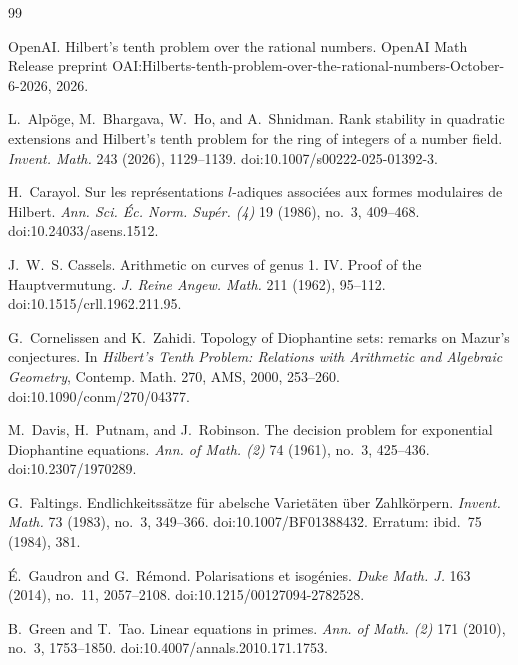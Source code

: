 \documentclass[11pt]{article}
\theoremstyle{definition}
\begin{document}
\begin{thebibliography}{99}\small

OpenAI.
\newblock Hilbert's tenth problem over the rational numbers.
\newblock OpenAI Math Release preprint
  OAI:Hilberts-tenth-problem-over-the-rational-numbers-October-6-2026, 2026.

L.~Alp\"oge, M.~Bhargava, W.~Ho, and A.~Shnidman.
\newblock Rank stability in quadratic extensions and Hilbert's tenth problem
  for the ring of integers of a number field.
\newblock \emph{Invent. Math.} 243 (2026), 1129--1139.
\newblock doi:10.1007/s00222-025-01392-3.

H.~Carayol.
\newblock Sur les repr\'esentations $l$-adiques associ\'ees aux formes
  modulaires de Hilbert.
\newblock \emph{Ann. Sci. \'Ec. Norm. Sup\'er. (4)} 19 (1986), no.~3, 409--468.
\newblock doi:10.24033/asens.1512.

J.~W.~S. Cassels.
\newblock Arithmetic on curves of genus 1. {IV}. {Proof} of the
  {Hauptvermutung}.
\newblock \emph{J. Reine Angew. Math.} 211 (1962), 95--112.
\newblock doi:10.1515/crll.1962.211.95.

G.~Cornelissen and K.~Zahidi.
\newblock Topology of Diophantine sets: remarks on Mazur's conjectures.
\newblock In \emph{Hilbert's Tenth Problem: Relations with Arithmetic and
  Algebraic Geometry}, Contemp. Math. 270, AMS, 2000, 253--260.
\newblock doi:10.1090/conm/270/04377.

M.~Davis, H.~Putnam, and J.~Robinson.
\newblock The decision problem for exponential Diophantine equations.
\newblock \emph{Ann. of Math. (2)} 74 (1961), no.~3, 425--436.
\newblock doi:10.2307/1970289.

G.~Faltings.
\newblock Endlichkeitss\"atze f\"ur abelsche Variet\"aten \"uber
  Zahlk\"orpern.
\newblock \emph{Invent. Math.} 73 (1983), no.~3, 349--366.
\newblock doi:10.1007/BF01388432.  Erratum: ibid.\ 75 (1984), 381.

\'E.~Gaudron and G.~R\'emond.
\newblock Polarisations et isog\'enies.
\newblock \emph{Duke Math. J.} 163 (2014), no.~11, 2057--2108.
\newblock doi:10.1215/00127094-2782528.

B.~Green and T.~Tao.
\newblock Linear equations in primes.
\newblock \emph{Ann. of Math. (2)} 171 (2010), no.~3, 1753--1850.
\newblock doi:10.4007/annals.2010.171.1753.


\end{thebibliography}
\end{document}
